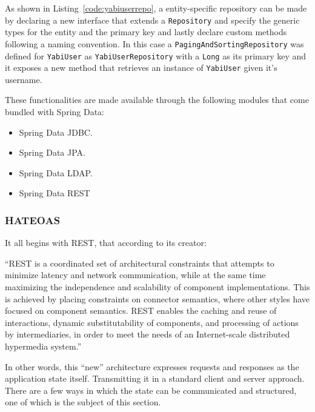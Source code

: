 As shown in Listing~\ref{code:yabiuserrepo}, a entity-specific repository can be made by declaring a new interface that extends a \texttt{Repository} and specify the generic types for the entity and the primary key and lastly declare custom methods following a naming convention. In this case a \texttt{PagingAndSortingRepository} was defined for \texttt{YabiUser} as \texttt{YabiUserRepository} with a \texttt{Long} as its primary key and it exposes a new method that retrieves an instance of \texttt{YabiUser} given it's username.



These functionalities are made available through the following modules that come bundled with Spring Data:
\begin{itemize}
\item Spring Data \gls{JDBC}.
\item Spring Data \gls{JPA}.
\item Spring Data \gls{LDAP}.
\item Spring Data \gls{REST}
\end{itemize}

\subsubsection{\gls{HATEOAS}}
It all begins with \gls{REST}, that according to its creator:
\begin{displayquote}
  ``REST is a coordinated set of architectural constraints that attempts to minimize latency and network communication, while at the same time maximizing the independence and scalability of component implementations. This is achieved  by  placing  constraints  on  connector  semantics,  where  other  styles have focused on component semantics. REST enables the caching and reuse of interactions, dynamic substitutability of components, and processing of actions by intermediaries, in order to meet the needs of an Internet-scale distributed hypermedia system.''~\cite{fielding}
\end{displayquote}

In other words, this ``new'' architecture expresses requests and responses as the application state itself. Transmitting it in a standard client and server approach. There are a few ways in which the state can be communicated and structured, one of which is the subject of this section. 

